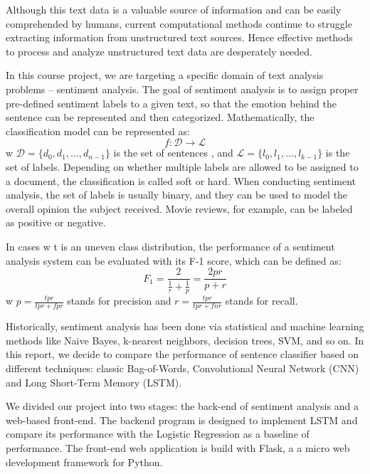 \documentclass[conference]{IEEEtran}
\begin{document}
    Although this text data is a valuable source of information
    and can be easily comprehended by humans, current computational methods
    continue to struggle extracting information from unstructured text
    sources.
    Hence effective methods to process and analyze unstructured text data are
    desperately needed.

    In this course project, we are targeting a specific domain of text analysis
    problems -- sentiment analysis. The goal of sentiment analysis is to assign
    proper pre-defined sentiment labels to a given text, so that the emotion behind the
    sentence can be represented and then categorized\cite{allahyari2017brief}.
    Mathematically, the classification model can be represented as:
    $$f:\mathcal{D}\rightarrow\mathcal{L}$$
    w $\mathcal{D}=\{d_0, d_1,\ldots, d_{n-1}\}$ is the set of sentences
    , and $\mathcal{L}=\{l_0, l_1,\ldots, l_{k-1}\}$ is the set of labels.
    Depending on whether multiple labels are allowed to be assigned to a document, the
    classification is called soft or hard\cite{gopal2010multilabel}. When conducting sentiment
    analysis, the set of labels is usually binary, and they can be used
    to model the overall opinion the subject received. Movie reviews, for example,
    can be labeled as positive or negative\cite{pang2002thumbs}.

    In cases w t is an uneven class distribution, the performance
    of a sentiment analysis system can be evaluated with its
    F-1 score, which can be defined as\cite{forman2003extensive}:
    $$F_1=\frac{2}{\frac{1}{r}+\frac{1}{p}}=\frac{2pr}{p+r}$$
    w $p=\frac{tpr}{tpr+fpr}$ stands for precision and $r=\frac{tpr}{tpr+fnr}$
    stands for recall.

    Historically, sentiment analysis has been done via statistical
    and machine learning methods like Naive Bayes, k-nearest neighbors, decision
    trees, SVM, and so on. In this report, we decide to compare the performance of
    sentence classifier based on different techniques:
    classic Bag-of-Words\cite{pang2002thumbs},
    Convolutional Neural Network (CNN)\cite{kim2014convolutional}
    and Long Short-Term Memory (LSTM)\cite{barnes2017assessing}.

    We divided our project into two stages: the back-end of sentiment analysis
    and a web-based front-end. The backend program is designed to implement
    LSTM and compare its performance with the Logistic Regression as a baseline
    of performance. The front-end web application is build with Flask, a
    a micro web development framework for Python.
\end{document}

